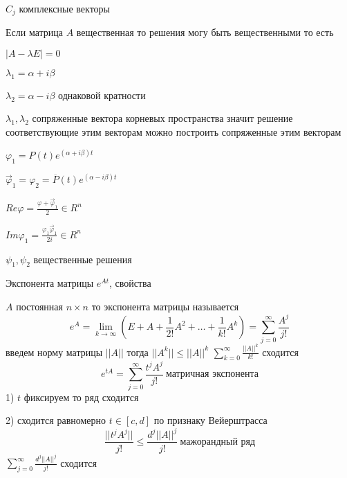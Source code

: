\begin{block}[Замечание]
  $C_j$ комплексные векторы

  Если матрица $A$ вещественная то решения могу быть вещественными то есть

  $|A - \lambda E| = 0$

  $\lambda_1 = \alpha + i\beta$

  $\lambda_2 = \alpha - i\beta$ однаковой кратности

  $\lambda_1, \lambda_2$ сопряженные вектора корневых пространства значит
  решение соответствующие этим векторам можно построить сопряженные этим
  векторам

  $\varphi_1 = P(t)e^{(\alpha + i\beta)t}$

  $\vec \varphi_1 = \varphi_2 = \overline{P}(t)e^{(\alpha - i\beta)t}$

  $Re\varphi = \frac{\varphi + \vec \varphi_1}{2} \in R^n$

  $Im \varphi_1 = \frac{\varphi_1 \vec \varphi_1}{2i} \in R^n$

  $\psi_1, \psi_2$ вещественные решения
\end{block}

\begin{title}[\Large]
  Экспонента матрицы $e^{At}$, свойства
\end{title}

\begin{define}
  $A$ постоянная $n \times n$ то экспонента матрицы называется
  $$
  e^A = \lim_{k \to \infty} \left( E + A + \frac{1}{2!}A^2 + \ldots +
  \frac{1}{k!} A^k \right) = \sum_{j=0}^{\infty}\frac{A^j}{j!}
  $$
  введем норму матрицы $||A||$ тогда $||A^k|| \le ||A||^k$ $\sum_{k=0}^{\infty}
  \frac{||A||^k}{k!}$ сходится
  $$
  e^{tA} = \sum_{j=0}^{\infty} \frac{t^j A^j}{j!} ~ \text{
  матричная экспонента}
  $$
  1) $t$ фиксируем то ряд сходится

  2) сходится равномерно $t \in [c,d]$  по признаку Вейерштрасса
  $$
  \frac{||t^j A^j||}{j!} \le \frac{d^j ||A||^j}{j!} ~ \text{мажорандный ряд}
  $$
  $\sum_{j=0}^{\infty}\frac{d^j ||A||^j}{j!}$ сходится
\end{define}


